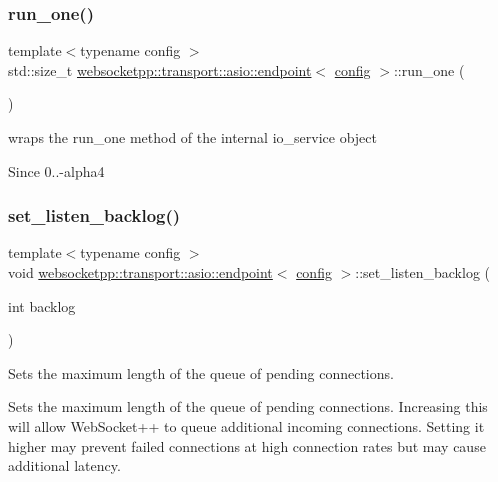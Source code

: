 \subsubsection{\texorpdfstring{run\+\_\+one()}{run\_one()}}
{\footnotesize\ttfamily template$<$typename config $>$ \\
std\+::size\+\_\+t \mbox{\hyperlink{classwebsocketpp_1_1transport_1_1asio_1_1endpoint}{websocketpp\+::transport\+::asio\+::endpoint}}$<$ \mbox{\hyperlink{classconfig}{config}} $>$\+::run\+\_\+one (\begin{DoxyParamCaption}{ }\end{DoxyParamCaption})\hspace{0.3cm}{\ttfamily [inline]}}



wraps the run\+\_\+one method of the internal io\+\_\+service object 

\begin{DoxySince}{Since}
0..-\/alpha4 
\end{DoxySince}
\mbox{\label{classwebsocketpp_1_1transport_1_1asio_1_1endpoint_a60bb0d01c277b7cfcb6f69215a36b216}} 
\subsubsection{\texorpdfstring{set\+\_\+listen\+\_\+backlog()}{set\_listen\_backlog()}}
{\footnotesize\ttfamily template$<$typename config $>$ \\
void \mbox{\hyperlink{classwebsocketpp_1_1transport_1_1asio_1_1endpoint}{websocketpp\+::transport\+::asio\+::endpoint}}$<$ \mbox{\hyperlink{classconfig}{config}} $>$\+::set\+\_\+listen\+\_\+backlog (\begin{DoxyParamCaption}\item[{int}]{backlog }\end{DoxyParamCaption})\hspace{0.3cm}{\ttfamily [inline]}}



Sets the maximum length of the queue of pending connections. 

Sets the maximum length of the queue of pending connections. Increasing this will allow Web\+Socket++ to queue additional incoming connections. Setting it higher may prevent failed connections at high connection rates but may cause additional latency.


